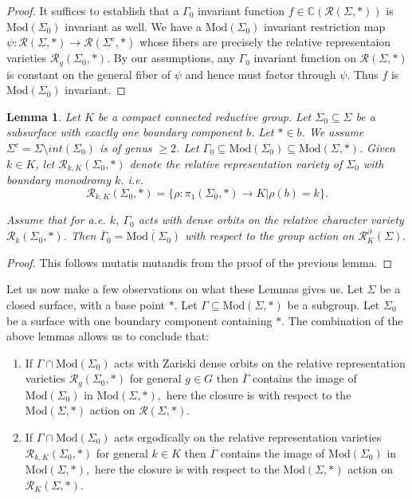 \documentclass{article}
\newcommand{\Rc}{\mathcal{R}}
\newcommand{\CC}{\mathbb{C}}
\newcommand{\Mod}{\textrm{Mod}}
\newtheorem{lemma}{Lemma}[theorem]
\begin{document}
\begin{proof}
    It suffices to establish that a $\Gamma_0$ invariant function $f \in \CC(\Rc(\Sigma,*))$ is  $\Mod(\Sigma_0)$ invariant as well.
    We have a $\Mod(\Sigma_0)$ invariant restriction map $\psi: \Rc(\Sigma, *) \to \Rc(\Sigma^c, *)$ whose fibers are precisely the relative representaion varieties $\Rc_g(\Sigma_0, *)$. By our assumptions, any $\Gamma_0$ invariant function on $\Rc(\Sigma,*)$ is constant on the general fiber of $\psi$ and hence must factor through $\psi.$ Thus $f$ is  $\Mod(\Sigma_0)$ invariant.
\end{proof}

\begin{lemma}\label{changeofclosureerg}
    Let $K$ be a compact connected reductive group.  
    Let $\Sigma_0 \subseteq \Sigma$ be a subsurface with exactly one boundary component $b$. Let $* \in b$. We assume $\Sigma^c = \Sigma \setminus int( \Sigma_0)$ is of genus $\ge 2$.
Let $\Gamma _0 \subseteq \Mod(\Sigma_0) \subseteq \Mod(\Sigma,*).$ Given $k \in K$, let  $\Rc_{k,K}(\Sigma_0, *)$ denote the relative representation variety of $\Sigma_0$ with boundary monodromy $k$. i.e. $$\Rc_{k,K}(\Sigma_0, *) = \{\rho : \pi_1(\Sigma_0,*) \to K | \rho(b) =k\}.$$

Assume that for a.e. $k$, $\Gamma_0$ acts with dense orbits on the relative character variety $\Rc_k(\Sigma_0, *)$. Then $\overline\Gamma_0 = \overline{\Mod(\Sigma_0)}$ with respect to the group action on $\Rc_K^{\partial}(\Sigma).$
\end{lemma}
\begin{proof}
    This follows mutatis mutandis from the proof of the previous lemma.
\end{proof}
Let us now make a few observations on what these Lemmas gives us. Let $\Sigma$ be a closed surface, with a base point $*$. Let $\Gamma \subseteq \Mod(\Sigma, *)$ be a subgroup.  Let $\Sigma_0$ be a surface with one boundary component containing $*$. 
The combination of the above lemmas allows us to conclude that:
\begin{enumerate}
    \item 
   If $\Gamma \cap \Mod(\Sigma_0)$ acts with Zariski dense orbits on the relative representation varieties $\Rc_g( \Sigma_0, *)$ for general $g \in G$ then $\overline{\Gamma}$ contains the image of  $\Mod(\Sigma_0)$ in $\Mod(\Sigma
    ,*),$ here the closure is with respect to the $\Mod(\Sigma, *)$ action on $\Rc(\Sigma,*).$
    \item   If $\Gamma \cap \Mod(\Sigma_0)$ acts ergodically on the relative representation varieties $\Rc_{k,K}( \Sigma_0, *)$ for general $k \in K$ then $\overline{\Gamma}$ contains the image of $\Mod(\Sigma_0)$ in $\Mod(\Sigma
    ,*),$ here the closure is with respect to the $\Mod(\Sigma,*)$ action on $\Rc_K(\Sigma,*).$
\end{enumerate}
\end{document}
